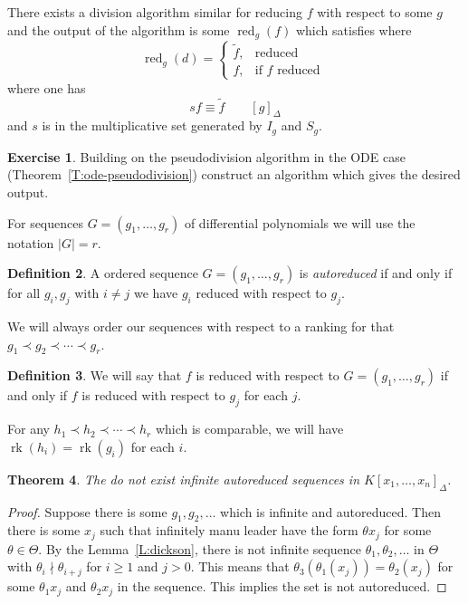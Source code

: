 \documentclass[12pt]{book}
\numberwithin{equation}{section}
\newtheorem{theorem}{Theorem}[subsection]
\theoremstyle{definition}
\newtheorem{definition}[theorem]{Definition}
\newtheorem{exercise}[theorem]{Exercise}
\theoremstyle{remark}
\newcommand{\red}{\operatorname{red}}
\newcommand{\rk}{\operatorname{rk}}
\begin{document}
There exists a division algorithm similar for reducing $f$ with respect to some $g$ and the output of the algorithm is some $\red_g(f)$ which satisfies where 
$$
\red_g(d) = \begin{cases}
\widetilde{f}, & \mbox{reduced} \\
f, & \mbox{if $f$ reduced } 
\end{cases}
$$
where one has 
 $$ s f \equiv \widetilde{f} \qquad [g]_{\Delta} $$
and $s$ is in the multiplicative set generated by $I_g$ and $S_g$.
\begin{exercise}
	Building on the pseudodivision algorithm in the ODE case (Theorem~\ref{T:ode-pseudodivision}) construct an algorithm which gives the desired output.
\end{exercise}

For sequences $G=(g_1,\ldots,g_r)$ of differential polynomials we will use the notation $\vert G \vert = r$.

\begin{definition}
	A ordered sequence $G=(g_1,\ldots,g_r)$ is \emph{autoreduced} if and only if for all $g_i,g_j$ with $i\neq j$ we have $g_i$ reduced with respect to $g_j$. 
\end{definition}

We will always order our sequences with respect to a ranking for that $g_1 \prec g_2 \prec \cdots \prec g_r$.

\begin{definition}
	We will say that $f$ is reduced with respect to $G=(g_1,\ldots,g_r)$ if and only if $f$ is reduced with respect to $g_j$ for each $j$.
\end{definition}

For any $h_1 \prec h_2 \prec \cdots \prec h_r$ which is comparable, we will have $\rk(h_i) = \rk(g_i)$ for each $i$. 

\begin{theorem}
	The do not exist infinite autoreduced sequences in $K[x_1,\ldots,x_n]_{\Delta}$. 
\end{theorem}
\begin{proof}
	Suppose there is some $g_1,g_2,\ldots$ which is infinite and autoreduced. 
	Then there is some $x_j$ such that infinitely manu leader have the form $\theta x_j$ for some $\theta \in \Theta$. 
	By the Lemma~\ref{L:dickson}, there is not infinite sequence $\theta_1,\theta_2,\ldots$ in $\Theta$ with $\theta_i \nmid \theta_{i+j}$ for $i\geq 1$ and $j>0$. 
	This means that $\theta_{3}(\theta_1(x_j))=\theta_2(x_j)$ for some $\theta_1 x_j$ and $\theta_2 x_j$ in the sequence. 
	This implies the set is not autoreduced.
\end{proof}
\end{document}
